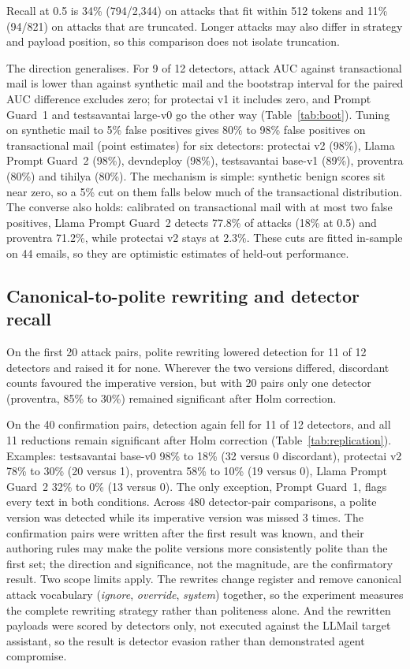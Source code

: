 \documentclass[11pt]{article}
\begin{document}
Recall at 0.5 is 34\% (794/2{,}344) on attacks that fit within 512 tokens and 11\% (94/821) on attacks that are truncated. Longer attacks may also differ in strategy and payload position, so this comparison does not isolate truncation.

The direction generalises. For 9 of 12 detectors, attack AUC against transactional mail is lower than against synthetic mail and the bootstrap interval for the paired AUC difference excludes zero; for protectai v1 it includes zero, and Prompt Guard~1 and testsavantai large-v0 go the other way (Table~\ref{tab:boot}). Tuning on synthetic mail to 5\% false positives gives 80\% to 98\% false positives on transactional mail (point estimates) for six detectors: protectai v2 (98\%), Llama Prompt Guard~2 (98\%), devndeploy (98\%), testsavantai base-v1 (89\%), proventra (80\%) and tihilya (80\%). The mechanism is simple: synthetic benign scores sit near zero, so a 5\% cut on them falls below much of the transactional distribution. The converse also holds: calibrated on transactional mail with at most two false positives, Llama Prompt Guard~2 detects 77.8\% of attacks (18\% at 0.5) and proventra 71.2\%, while protectai v2 stays at 2.3\%. These cuts are fitted in-sample on 44 emails, so they are optimistic estimates of held-out performance.

\subsection{Canonical-to-polite rewriting and detector recall}\label{sec:rq6}
On the first 20 attack pairs, polite rewriting lowered detection for 11 of 12 detectors and raised it for none. Wherever the two versions differed, discordant counts favoured the imperative version, but with 20 pairs only one detector (proventra, 85\% to 30\%) remained significant after Holm correction.

On the 40 confirmation pairs, detection again fell for 11 of 12 detectors, and all 11 reductions remain significant after Holm correction (Table~\ref{tab:replication}). Examples: testsavantai base-v0 98\% to 18\% (32 versus 0 discordant), protectai v2 78\% to 30\% (20 versus 1), proventra 58\% to 10\% (19 versus 0), Llama Prompt Guard~2 32\% to 0\% (13 versus 0). The only exception, Prompt Guard~1, flags every text in both conditions. Across 480 detector-pair comparisons, a polite version was detected while its imperative version was missed 3 times. The confirmation pairs were written after the first result was known, and their authoring rules may make the polite versions more consistently polite than the first set; the direction and significance, not the magnitude, are the confirmatory result. Two scope limits apply. The rewrites change register and remove canonical attack vocabulary (\emph{ignore}, \emph{override}, \emph{system}) together, so the experiment measures the complete rewriting strategy rather than politeness alone. And the rewritten payloads were scored by detectors only, not executed against the LLMail target assistant, so the result is detector evasion rather than demonstrated agent compromise.
\end{document}
